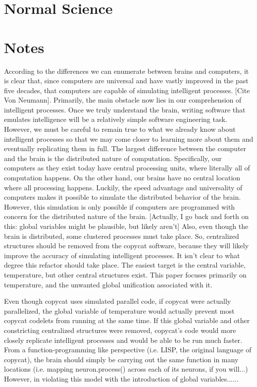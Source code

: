 \documentclass[a4paper]{article}
\begin{document}
\section{Normal Science}

\section{Notes}

    According to the differences we can enumerate between brains and computers, it is clear that, since computers are universal and have vastly improved in the past five decades, that computers are capable of simulating intelligent processes. 
    [Cite Von Neumann]. 
    Primarily, the main obstacle now lies in our comprehension of intelligent processes. 
    Once we truly understand the brain, writing software that emulates intelligence will be a relatively simple software engineering task. 
    However, we must be careful to remain true to what we already know about intelligent processes so that we may come closer to learning more about them and eventually replicating them in full. 
    The largest difference between the computer and the brain is the distributed nature of computation. 
    Specifically, our computers as they exist today have central processing units, where literally all of computation happens. 
    On the other hand, our brains have no central location where all processing happens. 
    Luckily, the speed advantage and universality of computers makes it possible to simulate the distributed behavior of the brain. 
    However, this simulation is only possible if computers are programmed with concern for the distributed nature of the brain.
    [Actually, I go back and forth on this: global variables might be plausible, but likely aren't]
    Also, even though the brain is distributed, some clustered processes must take place.
    So, centralized structures should be removed from the copycat software, because they will likely improve the accuracy of simulating intelligent processes.
    It isn't clear to what degree this refactor should take place.
    The easiest target is the central variable, temperature, but other central structures exist.
    This paper focuses primarily on temperature, and the unwanted global unification associated with it.

    Even though copycat uses simulated parallel code, if copycat were actually parallelized, the global variable of temperature would actually prevent most copycat codelets from running at the same time.
    If this global variable and other constricting centralized structures were removed, copycat's code would more closely replicate intelligent processes and would be able to be run much faster.
    From a function-programming like perspective (i.e. LISP, the original language of copycat), the brain should simply be carrying out the same function in many locations (i.e. mapping neuron.process() across each of its neurons, if you will...)
    However, in violating this model with the introduction of global variables......
\end{document}
